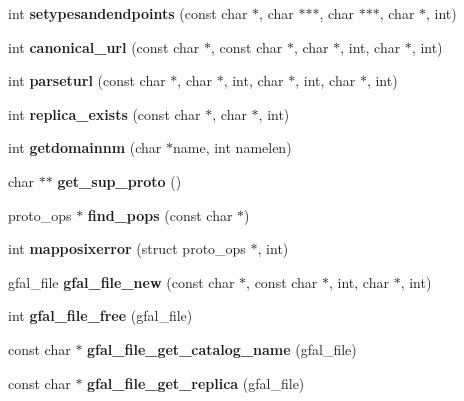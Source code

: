 \begin{CompactItemize}
\item 
int \textbf{setypesandendpoints} (const char $\ast$, char $\ast$$\ast$$\ast$, char $\ast$$\ast$$\ast$, char $\ast$, int)\label{group__internal__group_gf06de10d100ffd8ad880619661708810}

\item 
int \textbf{canonical\_\-url} (const char $\ast$, const char $\ast$, char $\ast$, int, char $\ast$, int)\label{group__internal__group_g845c890f2d493921bd587158fab72d65}

\item 
int \textbf{parseturl} (const char $\ast$, char $\ast$, int, char $\ast$, int, char $\ast$, int)\label{group__internal__group_g70868bce152313f31e24982453f10723}

\item 
int \textbf{replica\_\-exists} (const char $\ast$, char $\ast$, int)\label{group__internal__group_gac34379d44fb4037af134b34a9aae030}

\item 
int \textbf{getdomainnm} (char $\ast$name, int namelen)\label{group__internal__group_g446a829e4f333d3a0364ab0f2b5a2dc7}

\item 
char $\ast$$\ast$ \textbf{get\_\-sup\_\-proto} ()\label{group__internal__group_g03347619db3b30ef54ae6a98e351e21f}

\item 
proto\_\-ops $\ast$ \textbf{find\_\-pops} (const char $\ast$)\label{group__internal__group_g40d4c392e45e16062bc90caf0ebfa436}

\item 
int \textbf{mapposixerror} (struct proto\_\-ops $\ast$, int)\label{group__internal__group_gc8360922877ec368815d412209e862a2}

\item 
gfal\_\-file \textbf{gfal\_\-file\_\-new} (const char $\ast$, const char $\ast$, int, char $\ast$, int)\label{group__internal__group_g4c083c77e3b95b63f7a66d9cad7d24b4}

\item 
int \textbf{gfal\_\-file\_\-free} (gfal\_\-file)\label{group__internal__group_g564d0244067d6e1d424cea5ec1336be6}

\item 
const char $\ast$ \textbf{gfal\_\-file\_\-get\_\-catalog\_\-name} (gfal\_\-file)\label{group__internal__group_g8e5135cef19dfa4106dc8a6da1b78721}

\item 
const char $\ast$ \textbf{gfal\_\-file\_\-get\_\-replica} (gfal\_\-file)\label{group__internal__group_ga3feb45524d1a8e8cccd33249ee3ccb7}


\end{CompactItemize}
